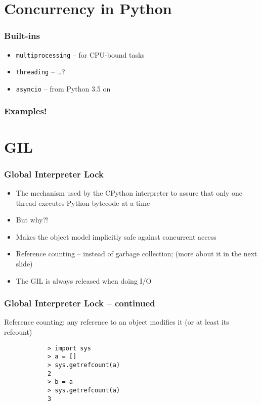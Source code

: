 \documentclass{beamer}
\begin{document}
    \section{Concurrency in Python}

    \begin{frame}
        \frametitle{Built-ins}

        \begin{itemize}
            \item \texttt{multiprocessing} -- for CPU-bound tasks
            \item \texttt{threading}  -- \dots?
            \item \texttt{asyncio} -- from Python 3.5 on
        \end{itemize}

    \end{frame}

    \begin{frame}
        \frametitle{Examples!}


    \end{frame}


    \section{GIL}

    \begin{frame}
        \frametitle{Global Interpreter Lock}

        \begin{itemize}
            \item The mechanism used by the CPython interpreter to assure that only one thread executes Python bytecode at a time
            \item But why?!
            \item Makes the object model implicitly safe against concurrent access
            \item Reference counting -- instead of garbage collection; (more about it in the next slide)
            \item The GIL is always released when doing I/O
        \end{itemize}

    \end{frame}

    \begin{frame}[fragile]
        \frametitle{Global Interpreter Lock -- continued}

        Reference counting:
        any reference to an object modifies it (or at least its refcount)
        \begin{verbatim}
            > import sys
            > a = []
            > sys.getrefcount(a)
            2
            > b = a
            > sys.getrefcount(a)
            3
        \end{verbatim}
    \end{frame}
\end{document}
